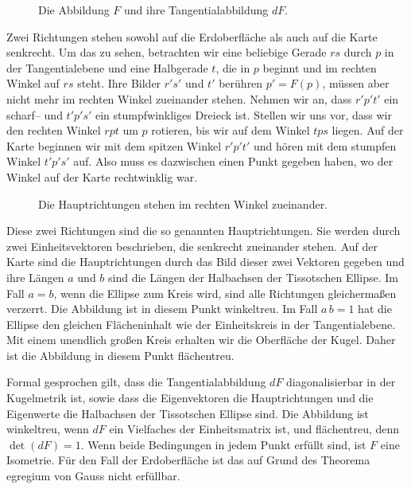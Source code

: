 \documentclass[a4paper,12pt]{article}
\begin{document}
\begin{figure}[h]
 \begin{center}
  \def\svgwidth{ 0.85 \textwidth}

\caption{Die Abbildung $F$ und ihre Tangentialabbildung $dF$.}
 \end{center}
\end{figure}

Zwei Richtungen stehen sowohl auf die Erdoberfläche als auch auf die Karte senkrecht.
Um das zu sehen, betrachten wir eine beliebige Gerade $rs$ durch $p$ in der 
Tangentialebene und eine 
Halbgerade $t$, die in $p$ beginnt und im rechten Winkel auf $rs$ steht. Ihre Bilder 
$r's'$ und $t'$ berühren $p'=F(p)$, müssen aber nicht mehr im rechten Winkel zueinander 
stehen. Nehmen wir an, dass $r'p't'$ ein scharf-- und $t'p's'$ ein stumpfwinkliges 
Dreieck ist. Stellen wir uns vor, dass wir den rechten Winkel $rpt$ um $p$ rotieren,
bis wir auf dem Winkel $tps$ liegen. Auf der Karte beginnen wir mit dem spitzen Winkel 
$r'p't'$ und hören mit dem stumpfen Winkel $t'p's'$ auf. Also muss es dazwischen 
einen Punkt gegeben haben, wo der Winkel auf der Karte rechtwinklig war.

\begin{figure}[ht]
 \begin{center}
  \def\svgwidth{ 0.85 \textwidth}

\caption{Die Hauptrichtungen stehen im rechten Winkel zueinander.}
 \end{center}
\end{figure}

Diese zwei Richtungen sind die so genannten Hauptrichtungen. Sie werden durch 
zwei Einheitsvektoren beschrieben, die senkrecht zueinander stehen. Auf der Karte 
sind die Hauptrichtungen durch das Bild dieser zwei Vektoren gegeben und ihre Längen
$a$ und $b$ sind die Längen der Halbachsen der Tissotschen Ellipse. Im Fall $a=b$, wenn 
die Ellipse zum Kreis wird, sind alle Richtungen gleichermaßen verzerrt. Die 
Abbildung ist in diesem Punkt winkeltreu. Im Fall $a\,b=1$ hat die Ellipse den gleichen 
Flächeninhalt wie der Einheitskreis in der Tangentialebene. Mit einem unendlich 
großen Kreis erhalten wir die Oberfläche der Kugel. Daher ist die Abbildung in diesem 
Punkt flächentreu.

Formal gesprochen gilt, dass die Tangentialabbildung $dF$ diagonalisierbar in der 
Kugelmetrik ist, sowie dass die Eigenvektoren die Hauptrichtungen und die Eigenwerte 
die Halbachsen der Tissotschen Ellipse sind. Die Abbildung ist winkeltreu, wenn 
$dF$ ein Vielfaches der Einheitsmatrix ist, und flächentreu, denn $\det(dF)=1$.
Wenn beide Bedingungen in jedem Punkt erfüllt sind, ist $F$ eine Isometrie. Für 
den Fall der Erdoberfläche ist das auf Grund des Theorema egregium von Gauss 
nicht erfüllbar.
 
\end{document}
